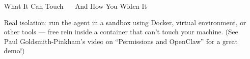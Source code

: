 \documentclass[aspectratio=169, 10pt]{beamer}
\begin{document}
\begin{frame}{What It Can Touch --- And How You Widen It}
\vfill
\begin{tcolorbox}[advancedbox]
\scriptsize Real isolation: run the agent in a sandbox using Docker, virtual environment, or other tools --- free rein inside a container that can't touch your machine. (See Paul Goldsmith-Pinkham's video on ``Permissions and OpenClaw'' for a great demo!)
\end{tcolorbox}
\end{frame}


%
%
%
%
\end{document}
